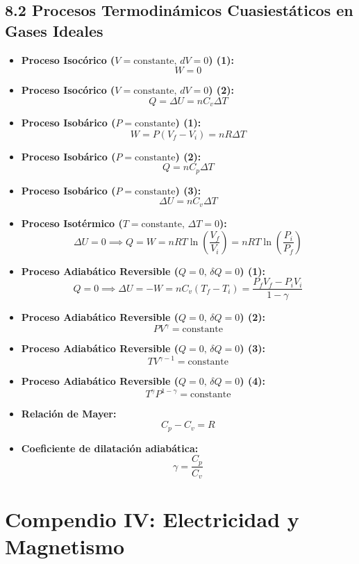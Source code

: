 \documentclass[11pt,a4paper]{article}
\begin{document}
\subsection*{8.2 Procesos Termodinámicos Cuasiestáticos en Gases Ideales}

\begin{itemize}
  \item \textbf{Proceso Isocórico ($V = \text{constante}, \, dV = 0$) (1):}
  \[
    W = 0
  \]
  \item \textbf{Proceso Isocórico ($V = \text{constante}, \, dV = 0$) (2):}
  \[
    Q = \Delta U = n C_v \Delta T
  \]
  \item \textbf{Proceso Isobárico ($P = \text{constante}$) (1):}
  \[
    W = P(V_f - V_i) = n R \Delta T
  \]
  \item \textbf{Proceso Isobárico ($P = \text{constante}$) (2):}
  \[
    Q = n C_p \Delta T
  \]
  \item \textbf{Proceso Isobárico ($P = \text{constante}$) (3):}
  \[
    \Delta U = n C_v \Delta T
  \]
  \item \textbf{Proceso Isotérmico ($T = \text{constante}, \, \Delta T = 0$):}
  \[
    \Delta U = 0 \implies Q = W = n R T \ln\left(\frac{V_f}{V_i}\right) = n R T \ln\left(\frac{P_i}{P_f}\right)
  \]
  \item \textbf{Proceso Adiabático Reversible ($Q = 0, \, \delta Q = 0$) (1):}
  \[
    Q = 0 \implies \Delta U = -W = n C_v (T_f - T_i) = \frac{P_f V_f - P_i V_i}{1 - \gamma}
  \]
  \item \textbf{Proceso Adiabático Reversible ($Q = 0, \, \delta Q = 0$) (2):}
  \[
    P V^\gamma = \text{constante}
  \]
  \item \textbf{Proceso Adiabático Reversible ($Q = 0, \, \delta Q = 0$) (3):}
  \[
    T V^{\gamma - 1} = \text{constante}
  \]
  \item \textbf{Proceso Adiabático Reversible ($Q = 0, \, \delta Q = 0$) (4):}
  \[
    T^\gamma P^{1 - \gamma} = \text{constante}
  \]
  \item \textbf{Relación de Mayer:}
  \[
    C_p - C_v = R
  \]
  \item \textbf{Coeficiente de dilatación adiabática:}
  \[
    \gamma = \frac{C_p}{C_v}
  \]
\end{itemize}

\section*{Compendio IV: Electricidad y Magnetismo}
\end{document}
